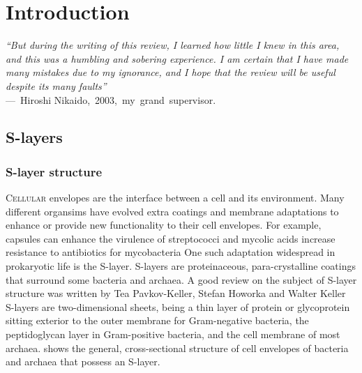 % 
\acresetall{} \resetlinenumber[1] 
  \chapter{Introduction} 
\label{ch:Introduction}

\begin{epigraph} \emph{``But during the writing of this review, I learned how little I knew in this area, and this was a humbling and sobering experience. I am certain that I have
made many mistakes due to my ignorance, and I hope that the review will be useful despite its many faults''}\\ ---~Hiroshi Nikaido,~2003,~my~grand~supervisor.
\end{epigraph}
\section{S-layers} \label{sec:intro-slayers}
\subsection{S-layer structure} %
\label{sub:s_layer_structure} \lettrine[lines=2]{C}{ellular} envelopes are the interface between a cell and its environment. Many different organsims have evolved extra coatings
and membrane adaptations to enhance or provide new functionality to their cell envelopes. For example, capsules can enhance the virulence of
streptococci and mycolic acids increase resistance to antibiotics for mycobacteria One such
adaptation widespread in prokaryotic life is the \ac{S-layer}. \Acp{S-layer} are proteinaceous, para-crystalline coatings that surround some bacteria and
archaea. A good review on the subject of \ac{S-layer} structure was written by Tea Pavkov-Keller, Stefan Howorka and Walter
Keller \Acp{S-layer} are two-dimensional sheets, being a thin layer of protein or glycoprotein sitting exterior to the outer membrane for Gram-negative bacteria, the
peptidoglycan layer in Gram-positive bacteria, and the cell membrane of most
archaea.  shows the general, cross-sectional structure of
cell envelopes of bacteria and
archaea that possess an S-layer.


